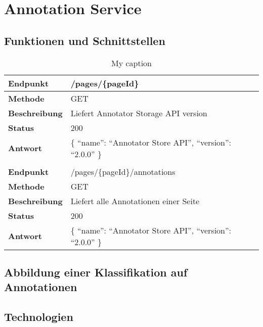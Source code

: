 \section{Annotation Service}
    \subsection{Funktionen und Schnittstellen}
        \begin{table}[htb]
            \centering
            \begin{tabular}{|l|l|}
            \hline
            \textbf{Endpunkt}     & /pages/\{pageId\}\\
            \hline
            \textbf{Methode}      & GET\\
            \hline
            \textbf{Beschreibung} & Liefert Annotator Storage API version\\
            \hline
            \textbf{Status}       & 200\\
            \hline
            \textbf{Antwort}      & \{ ``name'': ``Annotator Store API'', ``version'': ``2.0.0'' \}\\
            \hline
            & \\
            \hline
            \textbf{Endpunkt}     & /pages/\{pageId\}/annotations\\
            \hline
            \textbf{Methode}      & GET\\
            \hline
            \textbf{Beschreibung} & Liefert alle Annotationen einer Seite\\
            \hline
            \textbf{Status}       & 200\\
            \hline
            \textbf{Antwort}      & \{ ``name'': ``Annotator Store API'', ``version'': ``2.0.0'' \}\\
            \hline
            \end{tabular}
            \caption{My caption}
            \label{my-label}
        \end{table}

    \subsection{Abbildung einer Klassifikation auf Annotationen}
    \subsection{Technologien}
